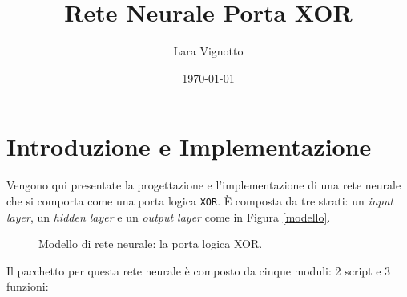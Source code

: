 \documentclass[a4paper,12pt]{article}
\title{\textbf{Rete Neurale Porta XOR}}
\author{Lara Vignotto}
\date{\today}
\begin{document}
\maketitle
\vfill
\tableofcontents
\vspace{5cm}


\newpage
\section{Introduzione e Implementazione}\label{intro}

Vengono qui presentate la progettazione e l'implementazione di una rete neurale che si comporta come una porta logica \texttt{XOR}. È composta da tre strati: un \emph{input layer}, un \emph{hidden layer} e un \emph{output layer} come in Figura \vref{modello}.

\begin{figure}[htb]
    \centering
    \caption{Modello di rete neurale: la porta logica XOR.}
    \label{modello}
\end{figure}

Il pacchetto per questa rete neurale è composto da cinque moduli: 2 script e 3 funzioni:
\end{document}
